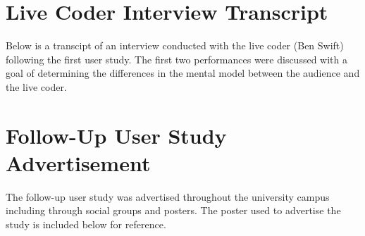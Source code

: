 





\chapter{Live Coder Interview Transcript}
\label{appendix:live-coder-interview-transcript}

Below is a transcipt of an interview conducted with the live coder (Ben Swift) following the first user study. The first two performances were discussed with a goal of determining the differences in the mental model between the audience and the live coder.




\chapter{Follow-Up User Study Advertisement}
\label{appendix:follow-up-user-study-advertisement}

The follow-up user study was advertised throughout the university campus including through social groups and posters. The poster used to advertise the study is included below for reference.

